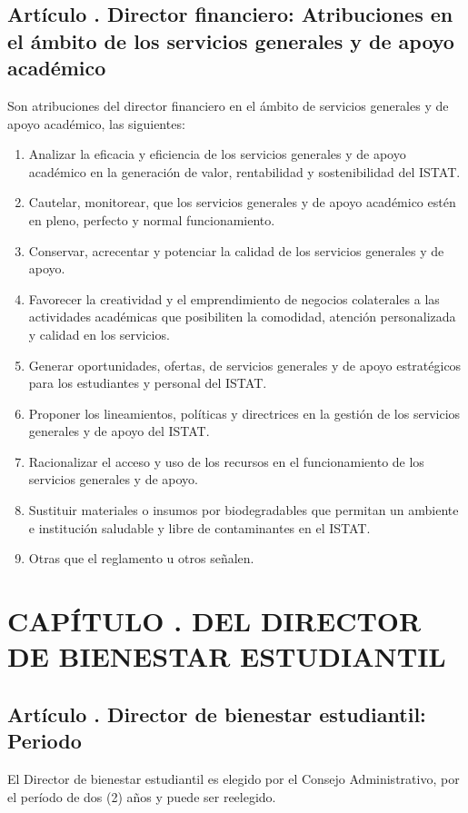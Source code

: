 \subsection{Artículo . Director financiero: Atribuciones en el ámbito de los servicios generales y de apoyo académico}
\addtocounter{ns}{1}
Son atribuciones del director financiero en el ámbito de servicios generales y de apoyo académico, las siguientes: 
\begin{enumerate}
\item Analizar la eficacia y eficiencia de los servicios generales y de apoyo académico en la generación de valor, rentabilidad y sostenibilidad del ISTAT. 
\item Cautelar, monitorear, que los servicios generales y de apoyo académico estén en pleno, perfecto y normal funcionamiento. 
\item Conservar, acrecentar y potenciar la calidad de los servicios generales y de apoyo. 
\item Favorecer la creatividad y el emprendimiento de negocios colaterales a las actividades académicas que posibiliten la comodidad, atención personalizada y calidad en los servicios. 
\item Generar oportunidades, ofertas, de servicios generales y de apoyo estratégicos para los estudiantes y personal del ISTAT. 
\item Proponer los lineamientos, políticas y directrices en la gestión de los servicios generales y de apoyo del ISTAT. 
\item Racionalizar el acceso y uso de los recursos en el funcionamiento de los servicios generales y de apoyo. 
\item Sustituir materiales o insumos por biodegradables que permitan un ambiente e institución saludable y libre de contaminantes en el ISTAT. 
\item Otras que el reglamento u otros señalen. 
\end{enumerate}
\section{CAPÍTULO . DEL DIRECTOR DE BIENESTAR ESTUDIANTIL}
\addtocounter{re}{1}
\subsection{Artículo . Director de bienestar estudiantil: Periodo}
\addtocounter{ns}{1}
El Director de bienestar estudiantil es elegido por el Consejo Administrativo, por el período de dos (2) años y puede ser reelegido.
